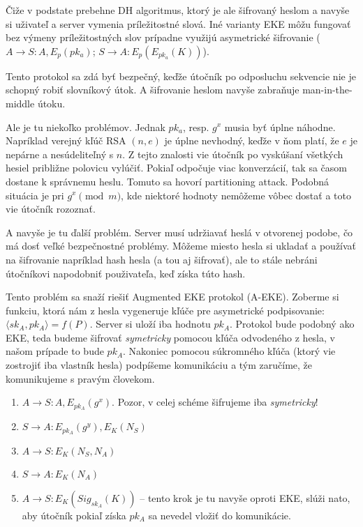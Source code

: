 Čiže v podstate prebehne DH algoritmus, ktorý je ale šifrovaný heslom a navyše
si uživateľ a server vymenia príležitostné slová.
Iné varianty EKE môžu fungovať bez výmeny príležitostných slov prípadne využijú asymetrické
šifrovanie ($A\to S\colon A, E_p(pk_a)$; $S\to A\colon E_p(E_{pk_a}(K))$).

Tento protokol sa zdá byť bezpečný, keďže útočník po odposluchu sekvencie nie je schopný
robiť slovníkový útok. A šifrovanie heslom navyše zabraňuje man-in-the-middle útoku.

Ale je tu niekoľko problémov. Jednak $pk_a$, resp. $g^x$ musia byť úplne náhodne.
Napríklad verejný kľúč RSA $(n,e)$ je úplne nevhodný, keďže v ňom platí, že $e$ je nepárne
a nesúdeliteľný s $n$. Z tejto znalosti vie útočník po vyskúšaní všetkých hesiel približne polovicu vylúčiť.
Pokiaľ odpočuje viac konverzácií, tak sa časom dostane k správnemu heslu. Tomuto sa hovorí partitioning attack.
Podobná situácia je pri $g^x \pmod m$, kde niektoré hodnoty nemôžeme vôbec dostať a toto vie útočník
rozoznať.

A navyše je tu ďalší problém. Server musí udržiavať heslá v otvorenej podobe, čo má dosť
veľké bezpečnostné problémy. Môžeme miesto hesla si ukladať a používať na šifrovanie napríklad hash hesla (a tou aj šifrovať), ale
to stále nebráni útočníkovi napodobniť použivateľa, keď získa túto hash.

Tento problém sa snaží riešiť Augmented EKE protokol (A-EKE).
Zoberme si funkciu, ktorá
nám z hesla vygeneruje kľúče pre asymetrické podpisovanie: 
$\langle sk_A, pk_A \rangle = f(P)$. 
Server si uloží iba hodnotu $pk_A$.
Protokol bude podobný ako EKE, teda budeme šifrovať \emph{symetricky}
pomocou kľúča odvodeného z hesla, v našom prípade to bude $pk_A$.
Nakoniec pomocou súkromného kľúča (ktorý vie zostrojiť iba vlastník hesla)
podpíšeme komunikáciu a tým zaručíme, že komunikujeme s pravým človekom.

\begin{enumerate}
    \item $A\to S\colon A, E_{pk_A}(g^x)$.
        Pozor, v celej schéme šifrujeme iba \emph{symetricky}!
    \item $S\to A\colon E_{pk_A}(g^y), E_K(N_S)$
    \item $A\to S\colon E_K(N_S, N_A)$
    \item $S\to A\colon E_K(N_A)$
    \item $A\to S\colon E_K(Sig_{sk_A}(K))$ --
        tento krok je tu navyše oproti EKE, slúži nato,
        aby útočník pokiaľ získa $pk_A$ sa nevedel vložiť do
        komunikácie.
\end{enumerate}

